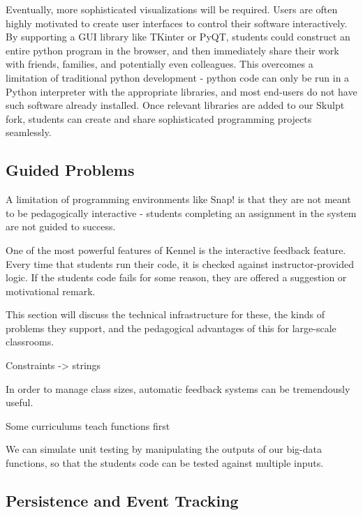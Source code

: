 \documentclass{sig-alternate}
\begin{document}
Eventually, more sophisticated visualizations will be required.
Users are often highly motivated to create user interfaces to control their software interactively.
By supporting a GUI library like TKinter or PyQT, students could construct an entire python program in the browser, and then immediately share their work with friends, families, and potentially even colleagues.
This overcomes a limitation of traditional python development - python code can only be run in a Python interpreter with the appropriate libraries, and most end-users do not have such software already installed.
Once relevant libraries are added to our Skulpt fork, students can create and share sophisticated programming projects seamlessly.
	
\subsection{Guided Problems}

A limitation of programming environments like Snap! is that they are not meant to be pedagogically interactive - students completing an assignment in the system are not guided to success.

One of the most powerful features of Kennel is the interactive feedback feature. Every time that students run their code, it is checked against instructor-provided logic. If the students code fails for some reason, they are offered a suggestion or motivational remark.

This section will discuss the technical infrastructure for these, the kinds of problems they support, and the pedagogical advantages of this for large-scale classrooms.

	Constraints -> strings
	
	In order to manage class sizes, automatic feedback systems can be tremendously useful.
	
	Some curriculums teach functions first
	
	We can simulate unit testing by manipulating the outputs of our big-data functions, so that the students code can
 be tested against multiple inputs.
	
\subsection{Persistence and Event Tracking}
\end{document}

